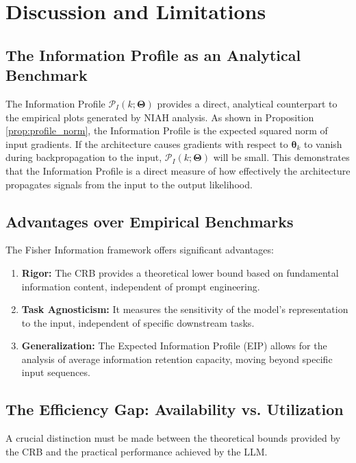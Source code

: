 \documentclass{article}
\theoremstyle{definition}
\begin{document}
\section{Discussion and Limitations}

\subsection{The Information Profile as an Analytical Benchmark}

The Information Profile $\mathcal{P}_I(k; \mathbf{\Theta})$ provides a direct, analytical counterpart to the empirical plots generated by NIAH analysis. As shown in Proposition \ref{prop:profile_norm}, the Information Profile is the expected squared norm of input gradients. If the architecture causes gradients with respect to $\boldsymbol{\theta}_k$ to vanish during backpropagation to the input, $\mathcal{P}_I(k; \mathbf{\Theta})$ will be small. This demonstrates that the Information Profile is a direct measure of how effectively the architecture propagates signals from the input to the output likelihood.

\subsection{Advantages over Empirical Benchmarks}
The Fisher Information framework offers significant advantages:

\begin{enumerate}
    \item \textbf{Rigor:} The CRB provides a theoretical lower bound based on fundamental information content, independent of prompt engineering.
    \item \textbf{Task Agnosticism:} It measures the sensitivity of the model's representation to the input, independent of specific downstream tasks.
    \item \textbf{Generalization:} The Expected Information Profile (EIP) allows for the analysis of average information retention capacity, moving beyond specific input sequences.
\end{enumerate}

\subsection{The Efficiency Gap: Availability vs. Utilization}
\label{sec:efficiency_gap}
A crucial distinction must be made between the theoretical bounds provided by the CRB and the practical performance achieved by the LLM.
\end{document}
